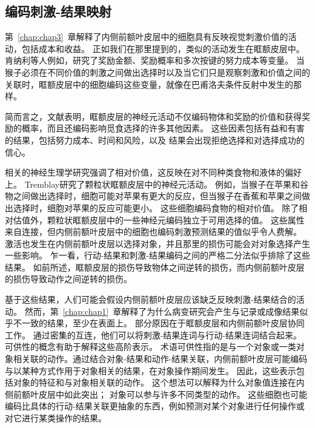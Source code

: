 \subsection{编码刺激-结果映射}

第~\ref{chap:chap3}~章解释了内侧前额叶皮层中的细胞具有反映视觉刺激价值的活动，包括成本和收益。
正如我们在那里提到的，类似的活动发生在眶额皮层中。 
肯纳利等人\cite{kennerley2009evaluating}例如，研究了奖励金额、奖励概率和多次按键的努力成本等变量。
当猴子必须在不同价值的刺激之间做出选择时\cite{seo2008cortical}以及当它们只是观察刺激和价值之间的关联时，眶额皮层中的细胞编码这些变量，就像在巴甫洛夫条件反射中发生的那样\cite{morrison2009convergence}。\par


简而言之，文献表明，眶额皮层的神经元活动不仅编码物体和奖励的价值\cite{padoa2006neurons}和获得奖励的概率\cite{kennerley2009evaluating}，而且还编码影响觅食选择的许多其他因素。
这些因素包括有益和有害的结果\cite{morrison2009convergence}，包括努力成本\cite{kennerley2009evaluating}、时间\cite{roesch2005neuronal}和风险\cite{o2010coding}，以及 结果会出现拒绝选择\cite{abe2011distributed}和对选择成功的信心\cite{kepecs2008neural}。\par


相关的神经生理学研究强调了相对价值，这反映在对不同种类食物和液体的偏好上。
Tremblay\cite{tremblay1999relative}研究了颗粒状眶额皮层中的神经元活动。
例如，当猴子在苹果和谷物之间做出选择时，细胞可能对苹果有更大的反应，但当猴子在香蕉和苹果之间做出选择时，细胞对苹果的反应可能更小。
这些细胞编码食物的相对价值。
除了相对估值外，颗粒状眶额皮层中的一些神经元编码独立于可用选择的值\cite{padoa2009range}。
这些属性来自连接，但内侧前额叶皮层中的细胞也编码刺激预测结果的值似乎令人费解\cite{kennerley2009evaluating}。
激活也发生在内侧前额叶皮层以选择对象\cite{behrens2007learning,glascher2009determining}，并且那里的损伤可能会对对象选择产生一些影响\cite{camille2011double}。
乍一看，行动-结果和刺激-结果编码之间的严格二分法似乎排除了这些结果。
如前所述，眶额皮层的损伤导致物体之间逆转的损伤\cite{rudebeck2006separate}，而内侧前额叶皮层的损伤导致动作之间逆转的损伤\cite{kennerley2006optimal}。\par


基于这些结果，人们可能会假设内侧前额叶皮层应该缺乏反映刺激-结果结合的活动。
然而，第~\ref{chap:chap1}~章解释了为什么病变研究会产生与记录或成像结果似乎不一致的结果，至少在表面上。
部分原因在于眶额皮层和内侧前额叶皮层协同工作。
通过密集的互连，他们可以将刺激-结果连词与行动-结果连词结合起来。
可供性的概念有助于解释这些高阶表示。
术语可供性指的是与一个对象或一类对象相关联的动作。通过结合对象-结果和动作-结果关联，内侧前额叶皮层可能编码与以某种方式作用于对象相关的结果，在对象操作期间发生。
因此，这些表示包括对象的特征和与对象相关联的动作。
这个想法可以解释为什么对象值连接在内侧前额叶皮层中如此突出；
对象可以参与许多不同类型的动作。
这些细胞也可能编码比具体的行动-结果关联更抽象的东西，例如预测对某个对象进行任何操作或对它进行某类操作的结果。\par


